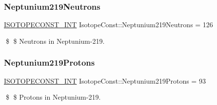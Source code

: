 \subsubsection{\texorpdfstring{Neptunium219\+Neutrons}{Neptunium219Neutrons}}
{\footnotesize\ttfamily \mbox{\hyperlink{group___isotope_const-_macros_ga5f18360b3e99483a35c32d789e62621c}{I\+S\+O\+T\+O\+P\+E\+C\+O\+N\+S\+T\+\_\+\+I\+NT}} Isotope\+Const\+::\+Neptunium219\+Neutrons = 126}

\$ \$ Neutrons in Neptunium-\/219. \mbox{\label{group___isotope_const-_neptunium-_np219_gadfcd010bd47354bbeecef89d2db714a3}} 
\subsubsection{\texorpdfstring{Neptunium219\+Protons}{Neptunium219Protons}}
{\footnotesize\ttfamily \mbox{\hyperlink{group___isotope_const-_macros_ga5f18360b3e99483a35c32d789e62621c}{I\+S\+O\+T\+O\+P\+E\+C\+O\+N\+S\+T\+\_\+\+I\+NT}} Isotope\+Const\+::\+Neptunium219\+Protons = 93}

\$ \$ Protons in Neptunium-\/219. 